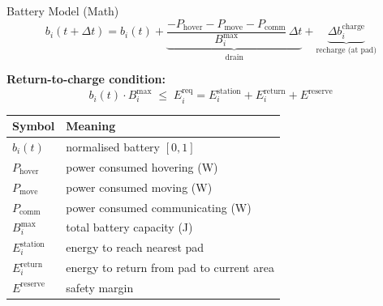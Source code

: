 \documentclass[aspectratio=169,12pt]{beamer}
\begin{document}
\begin{frame}{Battery Model (Math)}
\[
b_i(t+\Delta t) = b_i(t)
+ \underbrace{\frac{-P_{\text{hover}} - P_{\text{move}} - P_{\text{comm}}}{B_i^{\max}}\,\Delta t}_{\text{drain}}
+ \underbrace{\Delta b_i^{\text{charge}}}_{\text{recharge (at pad)}}
\]

\vspace{0.4em}
\textbf{Return-to-charge condition:}
\[
b_i(t) \cdot B_i^{\max}
\;\le\;
E_i^{\text{req}}
= E_i^{\text{station}} + E_i^{\text{return}} + E^{\text{reserve}}
\]

\vspace{0.3em}
\begin{tabular}{@{}ll@{}}
\toprule
\textbf{Symbol} & \textbf{Meaning} \\
\midrule
$b_i(t)$ & normalised battery $[0,1]$ \\
$P_{\text{hover}}$ & power consumed hovering (W) \\
$P_{\text{move}}$ & power consumed moving (W) \\
$P_{\text{comm}}$ & power consumed communicating (W) \\
$B_i^{\max}$ & total battery capacity (J) \\
$E_i^{\text{station}}$ & energy to reach nearest pad \\
$E_i^{\text{return}}$ & energy to return from pad to current area \\
$E^{\text{reserve}}$ & safety margin \\
\bottomrule
\end{tabular}
\end{frame}

\end{document}
